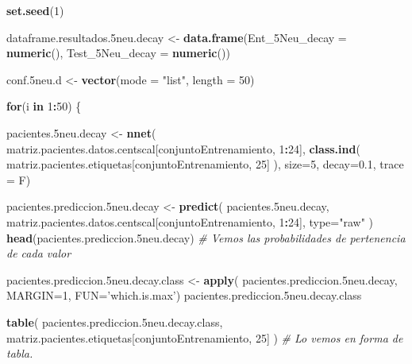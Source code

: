 \documentclass[]{article}
\newenvironment{Shaded}{\begin{snugshade}}{\end{snugshade}}
\newcommand{\CommentTok}[1]{\textcolor[rgb]{0.56,0.35,0.01}{\textit{#1}}}
\newcommand{\ControlFlowTok}[1]{\textcolor[rgb]{0.13,0.29,0.53}{\textbf{#1}}}
\newcommand{\DataTypeTok}[1]{\textcolor[rgb]{0.13,0.29,0.53}{#1}}
\newcommand{\DecValTok}[1]{\textcolor[rgb]{0.00,0.00,0.81}{#1}}
\newcommand{\FloatTok}[1]{\textcolor[rgb]{0.00,0.00,0.81}{#1}}
\newcommand{\KeywordTok}[1]{\textcolor[rgb]{0.13,0.29,0.53}{\textbf{#1}}}
\newcommand{\NormalTok}[1]{#1}
\newcommand{\OperatorTok}[1]{\textcolor[rgb]{0.81,0.36,0.00}{\textbf{#1}}}
\newcommand{\StringTok}[1]{\textcolor[rgb]{0.31,0.60,0.02}{#1}}
\begin{document}
\begin{Shaded}
\begin{Highlighting}[]
\KeywordTok{set.seed}\NormalTok{(}\DecValTok{1}\NormalTok{)}

\NormalTok{dataframe.resultados}\FloatTok{.5}\NormalTok{neu.decay <-}\StringTok{ }\KeywordTok{data.frame}\NormalTok{(}\DataTypeTok{Ent_5Neu_decay =} \KeywordTok{numeric}\NormalTok{(),}
                                              \DataTypeTok{Test_5Neu_decay =} \KeywordTok{numeric}\NormalTok{())}

\NormalTok{conf}\FloatTok{.5}\NormalTok{neu.d <-}\StringTok{ }\KeywordTok{vector}\NormalTok{(}\DataTypeTok{mode =} \StringTok{"list"}\NormalTok{, }\DataTypeTok{length =} \DecValTok{50}\NormalTok{)}

\ControlFlowTok{for}\NormalTok{(i }\ControlFlowTok{in} \DecValTok{1}\OperatorTok{:}\DecValTok{50}\NormalTok{)}
\NormalTok{\{}

\NormalTok{  pacientes}\FloatTok{.5}\NormalTok{neu.decay <-}\StringTok{ }\KeywordTok{nnet}\NormalTok{( matriz.pacientes.datos.centscal[conjuntoEntrenamiento, }\DecValTok{1}\OperatorTok{:}\DecValTok{24}\NormalTok{],}
                                \KeywordTok{class.ind}\NormalTok{( matriz.pacientes.etiquetas[conjuntoEntrenamiento, }\DecValTok{25}\NormalTok{] ),}
                                \DataTypeTok{size=}\DecValTok{5}\NormalTok{,}
                                \DataTypeTok{decay=}\FloatTok{0.1}\NormalTok{,}
                                \DataTypeTok{trace =}\NormalTok{ F)}
  
\NormalTok{  pacientes.prediccion}\FloatTok{.5}\NormalTok{neu.decay <-}\StringTok{ }\KeywordTok{predict}\NormalTok{( pacientes}\FloatTok{.5}\NormalTok{neu.decay, matriz.pacientes.datos.centscal[conjuntoEntrenamiento, }\DecValTok{1}\OperatorTok{:}\DecValTok{24}\NormalTok{], }\DataTypeTok{type=}\StringTok{"raw"}\NormalTok{ )}
  \KeywordTok{head}\NormalTok{(pacientes.prediccion}\FloatTok{.5}\NormalTok{neu.decay) }\CommentTok{# Vemos las probabilidades de pertenencia de cada valor}
  
\NormalTok{  pacientes.prediccion}\FloatTok{.5}\NormalTok{neu.decay.class <-}\StringTok{ }\KeywordTok{apply}\NormalTok{( pacientes.prediccion}\FloatTok{.5}\NormalTok{neu.decay, }\DataTypeTok{MARGIN=}\DecValTok{1}\NormalTok{, }\DataTypeTok{FUN=}\StringTok{'which.is.max'}\NormalTok{)}
\NormalTok{  pacientes.prediccion}\FloatTok{.5}\NormalTok{neu.decay.class}
  
  \KeywordTok{table}\NormalTok{( pacientes.prediccion}\FloatTok{.5}\NormalTok{neu.decay.class, matriz.pacientes.etiquetas[conjuntoEntrenamiento, }\DecValTok{25}\NormalTok{] )  }\CommentTok{# Lo vemos en forma de tabla.}
  

\end{Highlighting}
\end{Shaded}
\end{document}
